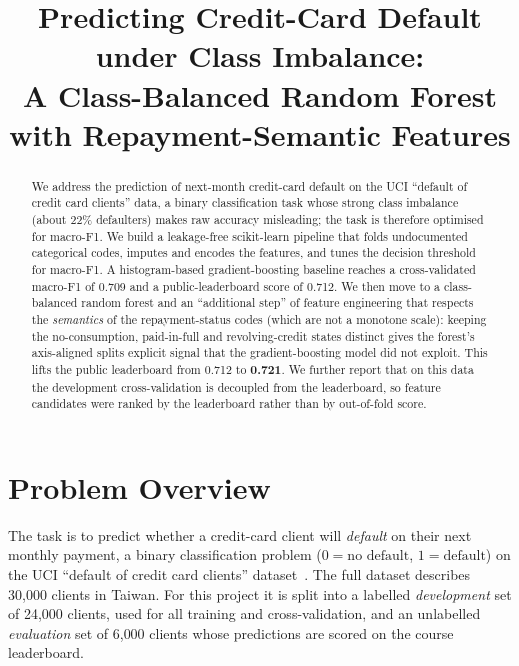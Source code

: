\documentclass[conference]{IEEEtran}
\begin{document}
\title{Predicting Credit-Card Default under Class Imbalance:\\
A Class-Balanced Random Forest with Repayment-Semantic Features}

\author{
}

\maketitle

\begin{abstract}
We address the prediction of next-month credit-card default on the UCI
``default of credit card clients'' data, a binary classification task whose
strong class imbalance (about 22\% defaulters) makes raw accuracy misleading;
the task is therefore optimised for macro-F1. We build a leakage-free
scikit-learn pipeline that folds undocumented categorical codes, imputes and
encodes the features, and tunes the decision threshold for macro-F1. A
histogram-based gradient-boosting baseline reaches a cross-validated macro-F1 of
0.709 and a public-leaderboard score of 0.712. We then move to a class-balanced
random forest and an ``additional step'' of feature engineering that respects the
\emph{semantics} of the repayment-status codes (which are not a monotone scale):
keeping the no-consumption, paid-in-full and revolving-credit states distinct
gives the forest's axis-aligned splits explicit signal that the gradient-boosting
model did not exploit. This lifts the public leaderboard from 0.712 to
\textbf{0.721}. We further report that on this data the development
cross-validation is decoupled from the leaderboard, so feature candidates were
ranked by the leaderboard rather than by out-of-fold score.
\end{abstract}

\section{Problem Overview}
The task is to predict whether a credit-card client will \emph{default} on
their next monthly payment, a binary classification problem
($0=\text{no default}$, $1=\text{default}$) on the UCI ``default of credit card
clients'' dataset~\cite{yeh2009, uci}. The full dataset describes 30{,}000
clients in Taiwan. For this project it is split into a labelled
\emph{development} set of 24{,}000 clients, used for all training and
cross-validation, and an unlabelled \emph{evaluation} set of 6{,}000 clients
whose predictions are scored on the course leaderboard.
\end{document}
